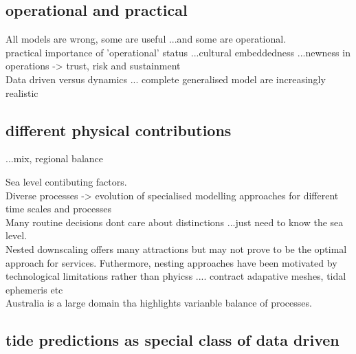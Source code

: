 \subsection{operational and practical}
All models are wrong, some are useful ...and some are operational.\\


practical importance of 'operational' status
 ...cultural embeddedness 
...newness in operations -> trust, risk and sustainment\\

Data driven versus dynamics ...
complete generalised model are increasingly realistic\\
% 

\subsection{different physical contributions}
 ...mix, regional balance






Sea level contibuting factors.\\
Diverse processes -> evolution of specialised modelling approaches for different time scales and processes\\
Many routine decisions dont care about distinctions ...just need to know the sea level.\\
Nested downscaling offers many attractions but may not prove to be the optimal approach for services.  Futhermore, nesting approaches have been motivated by technological limitations rather than phyicss .... contract adapative meshes, tidal ephemeris etc\\

Australia is a large domain tha highlights varianble balance of processes.\\


\subsection{tide predictions as special class of data driven}

